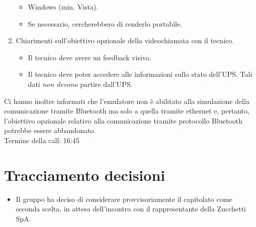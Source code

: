\begin{enumerate}
    \begin{itemize}
        \item Windows (min. Vista).
        \item Se necessario, cercherebbero di renderlo portabile.
    \end{itemize}
    \item Chiarimenti sull'obiettivo opzionale della videochiamata con il tecnico.
    \begin{itemize}
        \item Il tecnico deve avere un feedback visivo.
        \item Il tecnico deve poter accedere alle informazioni sullo stato dell'UPS. Tali dati \emph{non devono} partire dall'UPS.
    \end{itemize}
\end{enumerate}
Ci hanno inoltre informati che l'emulatore non è abilitato alla simulazione della comunicazione tramite Bluetooth ma solo a quella tramite ethernet e, pertanto, l'obiettivo opzionale relativo alla comunicazione tramite protocollo Bluetooth potrebbe essere abbandonato.\\
Termine della call: 16:45

\section{Tracciamento decisioni}
\begin{itemize}
    \item Il gruppo ha deciso di considerare provvisoriamente il capitolato come seconda scelta, in attesa dell'incontro con il rappresentante della Zucchetti SpA.
\end{itemize}
